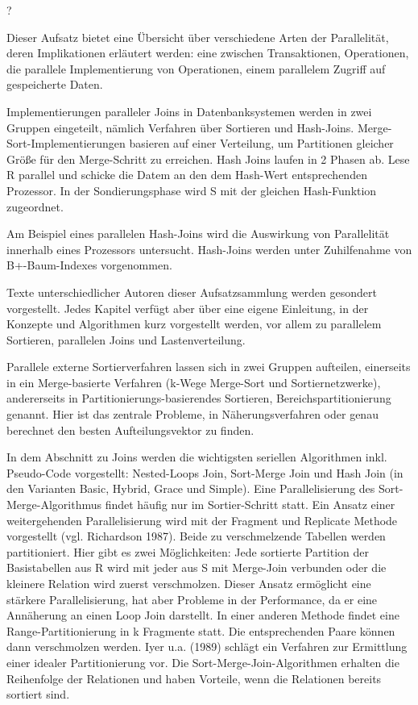 \documentclass[a4paper,12pt,twoside]{article}
\begin{document}
\textbf{} ?

Dieser Aufsatz bietet eine Übersicht über verschiedene Arten der Parallelität, deren Implikationen erläutert werden: eine zwischen Transaktionen, Operationen, die parallele Implementierung von Operationen, einem parallelem Zugriff auf gespeicherte Daten.

Implementierungen paralleler Joins in Datenbanksystemen werden in zwei Gruppen eingeteilt, nämlich Verfahren über Sortieren und Hash-Joins. Merge-Sort-Implementierungen basieren auf einer Verteilung, um Partitionen gleicher Größe für den Merge-Schritt zu erreichen. Hash Joins laufen in 2 Phasen ab. Lese R parallel und schicke die Datem an den dem Hash-Wert entsprechenden Prozessor. In der Sondierungsphase wird S mit der gleichen Hash-Funktion zugeordnet.

\textbf{}

Am Beispiel eines parallelen Hash-Joins wird die Auswirkung von Parallelität innerhalb eines Prozessors untersucht. Hash-Joins werden unter Zuhilfenahme von B+-Baum-Indexes vorgenommen. 

\textbf{}

Texte unterschiedlicher Autoren dieser Aufsatzsammlung werden gesondert vorgestellt. Jedes Kapitel verfügt aber über eine eigene Einleitung, in der Konzepte und Algorithmen kurz vorgestellt werden, vor allem zu parallelem Sortieren, parallelen Joins und Lastenverteilung.

Parallele externe Sortierverfahren lassen sich in zwei Gruppen aufteilen, einerseits in ein Merge-basierte Verfahren (k-Wege Merge-Sort und Sortiernetzwerke), andererseits in Partitionierungs-basierendes Sortieren, Bereichspartitionierung genannt. Hier ist das zentrale Probleme, in Näherungs\-verfahren oder genau berechnet den besten Aufteilungsvektor zu finden.

In dem Abschnitt zu Joins werden die wichtigsten seriellen Algorithmen inkl. Pseudo-Code vorgestellt: Nested-Loops Join, Sort-Merge Join und Hash Join (in den Varianten Basic, Hybrid, Grace und Simple). Eine Parallelisierung des Sort-Merge-Algorithmus findet häufig nur im Sortier-Schritt statt. Ein Ansatz einer weitergehenden Parallelisierung wird mit der Fragment und Replicate Methode vorgestellt (vgl. Richardson 1987). Beide zu verschmelzende Tabellen werden partitioniert. Hier gibt es zwei Möglichkeiten: Jede sortierte Partition der Basistabellen aus R wird mit jeder aus S mit Merge-Join verbunden oder die kleinere Relation wird zuerst verschmolzen. Dieser Ansatz ermöglicht eine stärkere Parallelisierung, hat aber Probleme in der Performance, da er eine Annäherung an einen Loop Join darstellt. In einer anderen Methode findet eine Range-Partitionierung in k Fragmente statt. Die entsprechenden Paare können dann verschmolzen werden. Iyer u.a. (1989) schlägt ein Verfahren zur Ermittlung einer idealer Partitionierung vor. Die Sort-Merge-Join-Algorithmen erhalten die Reihenfolge der Relationen und haben Vorteile, wenn die Relationen bereits sortiert sind.
\end{document}
